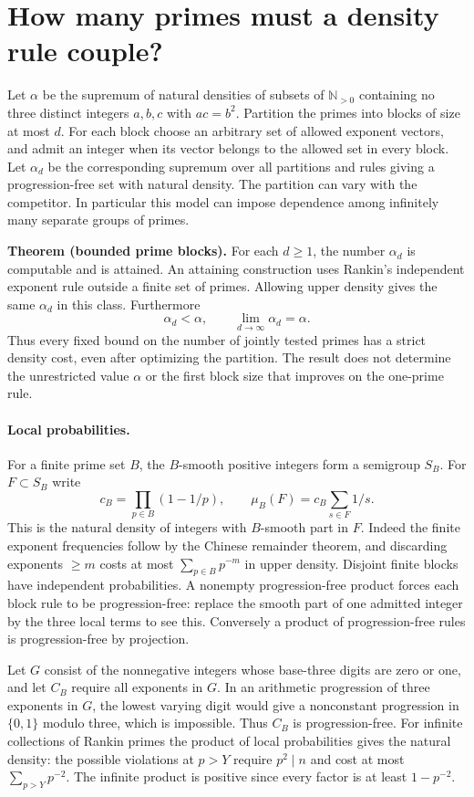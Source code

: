 \section{How many primes must a density rule couple?}
Let $\alpha$ be the supremum of natural densities of subsets of
$\mathbb N_{>0}$ containing no three distinct integers $a,b,c$ with
$ac=b^2$. Partition the primes into blocks of size at most $d$. For each
block choose an arbitrary set of allowed exponent vectors, and admit
an integer when its vector belongs to the allowed set in every block.
Let $\alpha_d$ be the corresponding supremum over all partitions and
rules giving a progression-free set with natural density.
The partition can vary with the competitor. In particular this model
can impose dependence among infinitely many separate groups of primes.

\medskip\noindent\textbf{Theorem (bounded prime blocks).}
For each $d\ge1$, the number $\alpha_d$ is computable and is attained.
An attaining construction uses Rankin's independent exponent rule
outside a finite set of primes. Allowing upper density gives the same
$\alpha_d$ in this class. Furthermore
\[
                  \alpha_d<\alpha,\qquad \lim_{d\to\infty}\alpha_d=\alpha .
\]
Thus every fixed bound on the number of jointly tested primes has a
strict density cost, even after optimizing the partition.
The result does not determine the unrestricted value $\alpha$ or the
first block size that improves on the one-prime rule.

\paragraph{Local probabilities.}
For a finite prime set $B$, the $B$-smooth positive integers form a
semigroup $S_B$. For $F\subset S_B$ write
\[
  c_B=\prod_{p\in B}(1-1/p),\qquad
  \mu_B(F)=c_B\sum_{s\in F}1/s.
\]
This is the natural density of integers with $B$-smooth part in $F$.
Indeed the finite exponent frequencies follow by the Chinese remainder
theorem, and discarding exponents $\ge m$ costs at most
$\sum_{p\in B}p^{-m}$ in upper density. Disjoint finite blocks have
independent probabilities. A nonempty progression-free product forces
each block rule to be progression-free: replace the smooth part of
one admitted integer by the three local terms to see this. Conversely
a product of progression-free rules is progression-free by projection.

Let $G$ consist of the nonnegative integers whose base-three digits
are zero or one, and let $C_B$ require all exponents in $G$. In an
arithmetic progression of three exponents in $G$, the lowest varying
digit would give a nonconstant progression in $\{0,1\}$ modulo three,
which is impossible. Thus $C_B$ is progression-free.
For infinite collections of Rankin primes the product of local
probabilities gives the natural density: the possible violations at
$p>Y$ require $p^2\mid n$ and cost at most $\sum_{p>Y}p^{-2}$.
The infinite product is positive since every factor is at least
$1-p^{-2}$.

